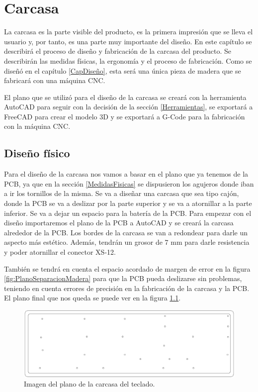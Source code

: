 \chapter{Carcasa}

La carcasa es la parte visible del producto, es la primera impresión que se lleva el usuario y, por tanto, es una parte muy importante del diseño. En este capítulo se describirá el proceso de diseño y fabricación de la carcasa del producto. Se describirán las medidas físicas, la ergonomía y el proceso de fabricación. Como se diseñó en el capítulo \ref{CapDiseño}, esta será una única pieza de madera que se fabricará con una máquina \gls{CNC}.

El plano que se utilizó para el diseño de la carcasa se creará con la herramienta AutoCAD para seguir con la decisión de la sección \ref{Herramientas}, se exportará a FreeCAD para crear el modelo 3D y se exportará a G-Code para la fabricación con la máquina \gls{CNC}.

\section{Diseño físico}
Para el diseño de la carcasa nos vamos a basar en el plano que ya tenemos de la \gls{PCB}, ya que en la sección \ref{MedidasFisicas} se dispusieron los agujeros donde iban a ir los tornillos de la misma. Se va a diseñar una carcasa que sea tipo cajón, donde la \gls{PCB} se va a deslizar por la parte superior y se va a atornillar a la parte inferior. Se va a dejar un espacio para la batería de la \gls{PCB}. Para empezar con el diseño importaremos el plano de la \gls{PCB} a AutoCAD y se creará la carcasa alrededor de la \gls{PCB}. Los bordes de la carcasa se van a redondear para darle un aspecto más estético. Además, tendrán un grosor de 7 mm para darle resistencia y poder atornillar el conector XS-12.

También se tendrá en cuenta el espacio acordado de margen de error en la figura \ref{fig:PlanoSeparacionMadera} para que la \gls{PCB} pueda deslizarse sin problemas, teniendo en cuenta errores de precisión en la fabricación de la carcasa y la \gls{PCB}. El plano final que nos queda se puede ver en la figura \ref{fig:PlanoCarcasa}.

\begin{figure}[H]
    \centering
    \includegraphics[width=1\textwidth]{imagenes/Capitulos/Cap06/PlanoCarcasa.png}
    \caption{Imagen del plano de la carcasa del teclado.}
    \label{fig:PlanoCarcasa}
\end{figure}

